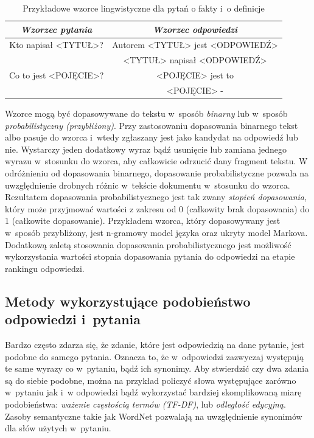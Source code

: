 \documentclass[a4paper, twoside, openright, 12pt]{report}
\begin{document}
            \begin{table}[h]
                \begin{tabular}{ | c | c | }
                  \hline
                  \emph{Wzorzec pytania} & \emph{Wzorzec odpowiedzi} \\ \hline
                  Kto napisał <TYTUŁ>? & Autorem <TYTUŁ> jest <ODPOWIEDŹ> \\
                   & <TYTUŁ> napisał <ODPOWIEDŹ>\\ \hline
                  Co to jest <POJĘCIE>? & <POJĘCIE> jest to \\
                   & <POJĘCIE> - \\
                  \hline
                \end{tabular}
                \caption{Przykładowe wzorce lingwistyczne dla pytań o fakty i~o definicje}
                \label{TAB:PATTERNS}
            \end{table}

            Wzorce mogą być dopasowywane do tekstu w~sposób \emph{binarny} lub w~sposób \emph{probabilistyczny (przybliżony)}. Przy
            zastosowaniu dopasowania binarnego tekst albo pasuje do wzorca i~wtedy zgłaszany jest jako kandydat na
            odpowiedź lub nie. Wystarczy jeden dodatkowy wyraz bądź usunięcie lub zamiana  jednego wyrazu w~stosunku
            do wzorca, aby całkowicie odrzucić dany fragment tekstu. W odróżnieniu od dopasowania binarnego, dopasowanie
            probabilistyczne pozwala na uwzględnienie drobnych różnic w~tekście dokumentu w~stosunku do wzorca. Rezultatem
            dopasowania probabilistycznego jest tak zwany \emph{stopień dopasowania}, który może przyjmować wartości z
            zakresu od 0 (całkowity brak dopasowania) do 1 (całkowite dopasowanie). Przykładem wzorca, który dopasowywany
            jest w~sposób przybliżony, jest n-gramowy model języka oraz ukryty model Markova\cite{SOFTPATTERNMATCHING}.
            Dodatkową zaletą stosowania dopasowania probabilistycznego jest możliwość wykorzystania wartości stopnia
            dopasowania pytania do odpowiedzi na etapie rankingu odpowiedzi.

        \subsection{Metody wykorzystujące podobieństwo odpowiedzi i~pytania}
            Bardzo często zdarza się, że zdanie, które jest odpowiedzią na dane pytanie, jest podobne do samego pytania.
            Oznacza to, że w~odpowiedzi zazwyczaj występują te same wyrazy co w~pytaniu, bądź ich synonimy. Aby stwierdzić
            czy dwa zdania są do siebie podobne, można na przykład policzyć słowa występujące zarówno w~pytaniu jak i~w
            odpowiedzi bądź wykorzystać bardziej skomplikowaną miarę podobieństwa: \emph{ważenie częstością termów (TF-DF)},
            lub \emph{odległość edycyjną}. Zasoby semantyczne
            takie jak WordNet pozwalają na uwzględnienie synonimów dla słów użytych w~pytaniu.
\end{document}
